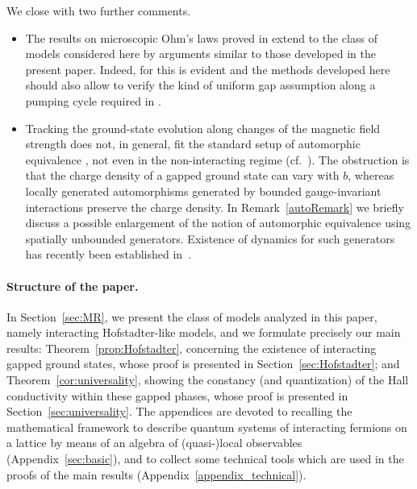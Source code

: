 \documentclass[a4paper]{article}
\theoremstyle{plain}
\theoremstyle{definition}
\theoremstyle{remark}
\renewcommand{\(}{\left(}
\renewcommand{\)}{\right)}
\begin{document}
We close with two further comments.
\begin{itemize}
    \item
    The results on microscopic Ohm's laws proved in \cite{klein1990power,bachmann2021exactness,TW2025}  extend to the class of models considered here by arguments similar to those developed in the present paper. 
Indeed, for \cite{TW2025} this is evident and the methods developed here should also allow to  verify   the kind of uniform gap assumption along a pumping cycle required in \cite{klein1990power,bachmann2021exactness}.
\item 
Tracking the ground-state evolution along changes of the magnetic field strength does not, in general, fit the standard setup of automorphic equivalence \cite{BMNS12}, not even in the non-interacting regime (cf.~\cite{cornean2021beyond}). 
The obstruction is that the charge density of a gapped ground state can vary with $b$, whereas locally generated automorphisms generated by bounded gauge-invariant interactions preserve the charge density. 
In Remark~\ref{autoRemark} we briefly discuss a possible enlargement of the notion of automorphic equivalence using spatially unbounded generators. Existence of dynamics for such generators has recently been established in~\cite{TWW26}.
\end{itemize}


\paragraph{Structure of the paper.}

In Section~\ref{sec:MR}, we present the class of models analyzed in this paper, namely interacting Hofstadter-like models, and we formulate precisely our main results: Theorem~\ref{prop:Hofstadter}, concerning the existence of interacting gapped ground states, whose proof is presented in Section~\ref{sec:Hofstadter}; and Theorem~\ref{cor:universality}, showing the constancy (and  quantization) of the Hall conductivity within these gapped phases, whose proof is presented in Section~\ref{sec:universality}. The appendices are devoted to recalling the mathematical framework to describe quantum systems of interacting fermions on a lattice by means of an algebra of (quasi-)local observables (Appendix~\ref{sec:basic}), and to collect some technical tools which are used in the proofs of the main results (Appendix~\ref{appendix_technical}).
\end{document}
